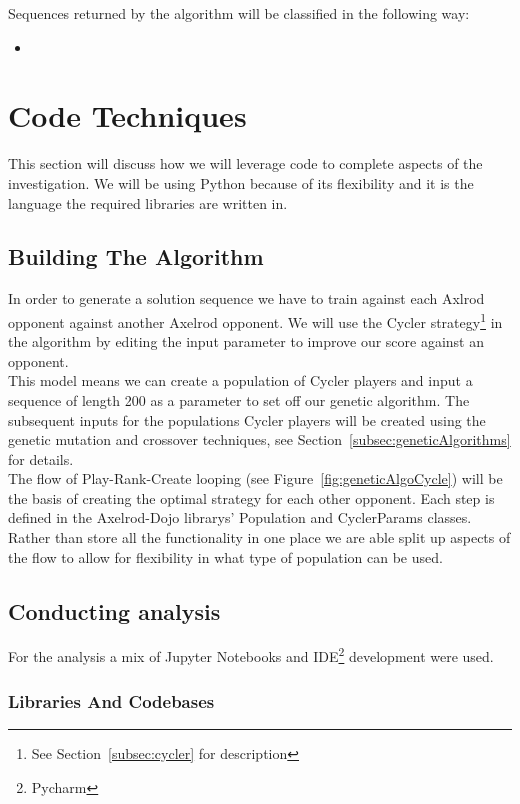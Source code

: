 Sequences returned by the algorithm will be classified in the following way:
\begin{itemize}
 \item
\end{itemize}

\section{Code Techniques}\label{sec:codeTechniques}
This section will discuss how we will leverage code to complete aspects of the investigation.
We will be using Python because of its flexibility and it is the language the required libraries are written in.

\subsection{Building The Algorithm}\label{subsec:buildingTheAlgorthem}
In order to generate a solution sequence we have to train against each Axlrod opponent against another Axelrod opponent.
We will use the Cycler strategy\footnote{See Section~\ref{subsec:cycler} for description} in the algorithm by editing the input parameter to improve our score against an opponent.\\

This model means we can create a population of Cycler players and input a sequence of length 200 as a parameter to set off our genetic algorithm.
The subsequent inputs for the populations Cycler players will be created using the genetic mutation and crossover techniques, see Section~\ref{subsec:geneticAlgorithms} for details.\\

The flow of Play-Rank-Create looping (see Figure~\ref{fig:geneticAlgoCycle}) will be the basis of creating the optimal strategy for each other opponent.
Each step is defined in the Axelrod-Dojo librarys' Population and CyclerParams classes.
Rather than store all the functionality in one place we are able split up aspects of the flow to allow for flexibility in what type of population can be used.

\subsection{Conducting analysis}\label{subsec:conductingAnalysis}
For the analysis a mix of Jupyter Notebooks and IDE\footnote{Pycharm} development were used.

\subsubsection{Libraries And Codebases}
